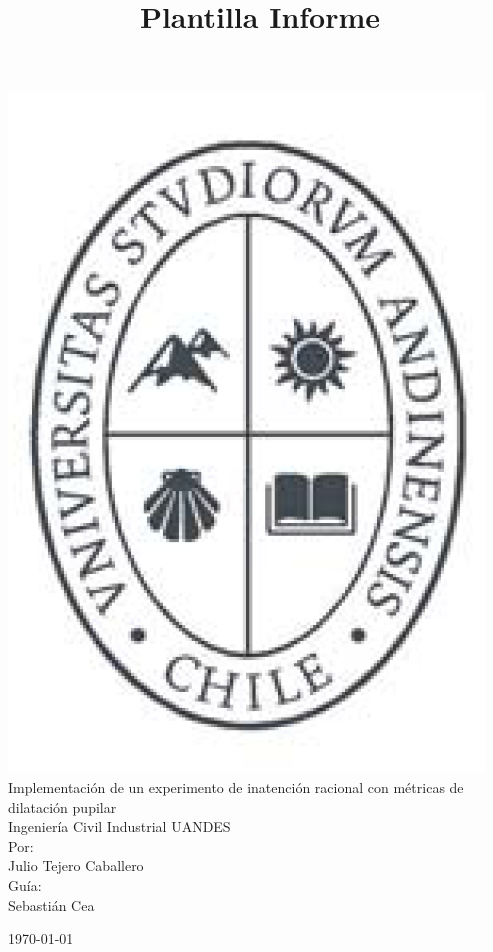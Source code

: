 \documentclass[11pt,letterpaper]{article}
\title{Plantilla Informe}
\begin{document}

\begin{titlepage}

\begin{center}
\includegraphics[scale=0.3]{Log.png}\\
\vspace{1.0cm} {\LARGE Implementación de un experimento de inatención racional con métricas de dilatación pupilar\\ Ingenier\'ia Civil Industrial UANDES}\\

\vspace{1.5cm} \LARGE{Por:\\ Julio Tejero Caballero \\ Gu\'ia: \\ Sebasti\'an Cea}

\vspace{2.3cm}

\vspace{.5cm} \today

\end{center}
\end{titlepage}
\end{document}
